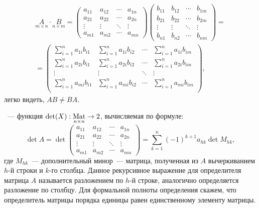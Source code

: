     \begin{multline}
        \underset{m \times n}{A} \cdot \underset{n \times m}{B} =
        \begin{pmatrix}
            a_{11} & a_{12} & \cdots & a_{1n}\\
            a_{21} & a_{22} & \cdots & a_{2n}\\
            \vdots & \vdots & \ddots & \vdots\\
            a_{m1} & a_{m2} & \cdots & a_{mn}
        \end{pmatrix}
        \begin{pmatrix}
            b_{11} & b_{12} & \cdots & b_{1m}\\
            b_{21} & b_{22} & \cdots & b_{2m}\\
            \vdots & \vdots & \ddots & \vdots\\
            b_{n1} & b_{n2} & \cdots & b_{nm}
        \end{pmatrix} = \\
        = \begin{pmatrix}
            \sum\limits_{i=1}^{n} a_{1i} b_{i1} & \sum\limits_{i=1}^{n} a_{1i} b_{i2} & \cdots & \sum\limits_{i=1}^{n} a_{1i} b_{im}\\
            \sum\limits_{i=1}^{n} a_{2i} b_{i1} & \sum\limits_{i=1}^{n} a_{2i} b_{i2} & \cdots & \sum\limits_{i=1}^{n} a_{2i} b_{im}\\
            \vdots & \vdots & \ddots & \vdots\\
            \sum\limits_{i=1}^{n} a_{mi} b_{i1} & \sum\limits_{i=1}^{n} a_{mi} b_{i2} & \cdots & \sum\limits_{i=1}^{n} a_{m    i} b_{im}\\
        \end{pmatrix},
    \end{multline}
    легко видеть, $A B \not = B A$.

    ~--- функция $\det(X):\underset{n \times n}{\text{Mat}} \rightarrow 2$, вычисляемая по формуле:
    \begin{equation}
        \det A = \det
        \begin{pmatrix}
            a_{11} & a_{12} & \cdots & a_{1n}\\
            a_{21} & a_{22} & \cdots & a_{2n}\\
            \vdots & \vdots & \ddots & \vdots\\
            a_{m1} & a_{m2} & \cdots & a_{mn}
        \end{pmatrix} =
        \sum\limits_{k = 1}^n (-1)^{k+1} a_{hk} \det M_{hk},
        \label{eq:det-def1}
    \end{equation}
    где $M_{hk}$~--- дополнительный минор~--- матрица, полученная из $A$ вычеркиванием $h$-й строки и $k$-го столбца. Данное рекурсивное выражение для определителя матрица $A$ называется разложением по $h$-й строке, аналогично определяется разложение по столбцу. Для формальной полноты определения скажем, что определитель матрицы порядка единицы равен единственному элементу матрицы.

